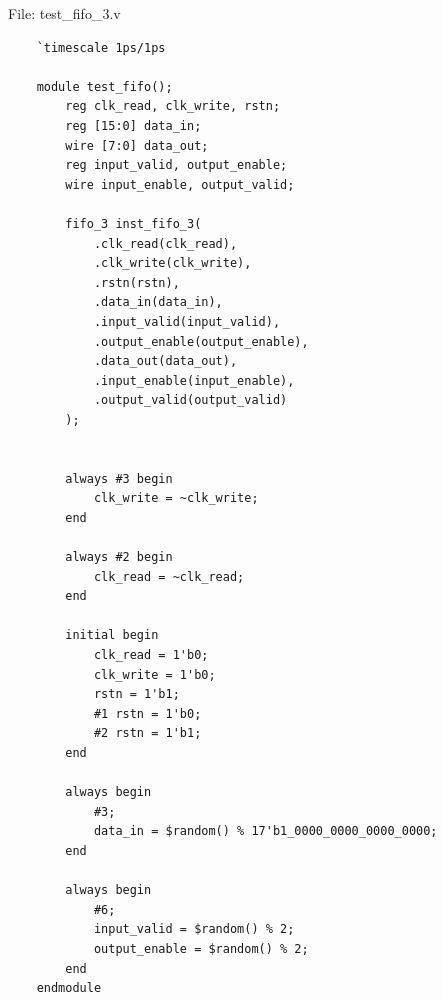 \documentclass{article}
\begin{document}
File: test\_fifo\_3.v
\begin{lstlisting}
    `timescale 1ps/1ps

    module test_fifo();
        reg clk_read, clk_write, rstn;
        reg [15:0] data_in;
        wire [7:0] data_out;
        reg input_valid, output_enable;
        wire input_enable, output_valid;
    
        fifo_3 inst_fifo_3(
            .clk_read(clk_read),
            .clk_write(clk_write),
            .rstn(rstn),
            .data_in(data_in),
            .input_valid(input_valid),
            .output_enable(output_enable),
            .data_out(data_out),
            .input_enable(input_enable),
            .output_valid(output_valid)
        );
    
    
        always #3 begin
            clk_write = ~clk_write;
        end
    
        always #2 begin
            clk_read = ~clk_read;
        end
    
        initial begin
            clk_read = 1'b0;
            clk_write = 1'b0;
            rstn = 1'b1;
            #1 rstn = 1'b0;
            #2 rstn = 1'b1;
        end
    
        always begin
            #3;
            data_in = $random() % 17'b1_0000_0000_0000_0000;
        end
    
        always begin
            #6;
            input_valid = $random() % 2;
            output_enable = $random() % 2;
        end
    endmodule
\end{lstlisting}
\end{document}
